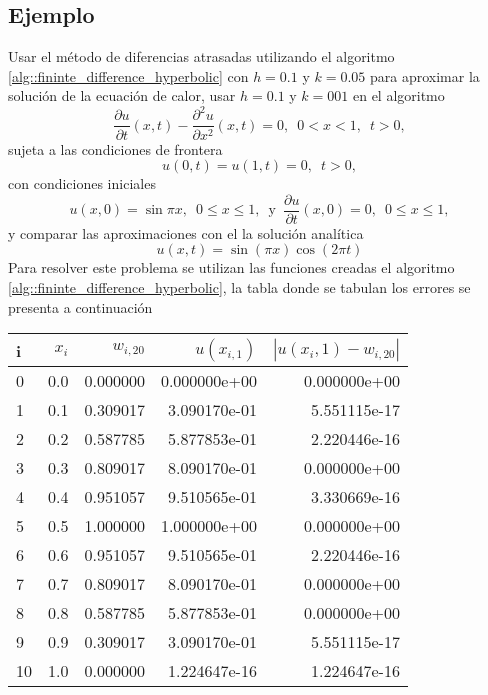 \documentclass[a4paper]{article}
\begin{document}
\subsection{Ejemplo}
Usar el método de diferencias atrasadas utilizando el algoritmo \ref{alg::fininte_difference_hyperbolic} con $h=0.1$ y $k=0.05$ para aproximar la solución de la ecuación de calor, usar $h=0.1$ y $k=001$ en el algoritmo
\begin{equation}
\frac{\partial u}{\partial t}(x,t) -\frac{\partial^2 u}{\partial x ^2}(x,t)=0, \,\,\, 0<x<1,\,\,\, t>0,
\end{equation}
sujeta a las condiciones de frontera
\begin{equation*}
u(0,t)=u(1,t)=0,\,\,\, t>0,
\end{equation*}
con condiciones iniciales
\begin{equation}
u(x,0)=\sin{\pi x},\,\,\, 0\leq x \leq 1,\,\,\,\text{y}\,\,\,\frac{\partial u}{\partial t}(x,0)=0,\,\,\, 0\leq x \leq 1,
\end{equation}
y comparar las aproximaciones con el la solución analítica
\begin{equation}
u(x,t)=\sin{(\pi x)}\cos{(2\pi t)}
\end{equation}
Para  resolver este problema se utilizan las funciones creadas el algoritmo \ref{alg::fininte_difference_hyperbolic}, la tabla donde se tabulan los errores se presenta a continuación\\
\begin{table}\label{Tab::table_1}
\begin{tabular}{lrrrr}%
\toprule
i &  $x_i$ &    $w_{i,20}$ &      $u(x_{i,1})$ &  $|u(x{_i,1})-w_{i,20}|$ \\
\midrule
0  &  0.0 &  0.000000 &  0.000000e+00 &       0.000000e+00 \\
1  &  0.1 &  0.309017 &  3.090170e-01 &       5.551115e-17 \\
2  &  0.2 &  0.587785 &  5.877853e-01 &       2.220446e-16 \\
3  &  0.3 &  0.809017 &  8.090170e-01 &       0.000000e+00 \\
4  &  0.4 &  0.951057 &  9.510565e-01 &       3.330669e-16 \\
5  &  0.5 &  1.000000 &  1.000000e+00 &       0.000000e+00 \\
6  &  0.6 &  0.951057 &  9.510565e-01 &       2.220446e-16 \\
7  &  0.7 &  0.809017 &  8.090170e-01 &       0.000000e+00 \\
8  &  0.8 &  0.587785 &  5.877853e-01 &       0.000000e+00 \\
9  &  0.9 &  0.309017 &  3.090170e-01 &       5.551115e-17 \\
10 &  1.0 &  0.000000 &  1.224647e-16 &       1.224647e-16 \\
\bottomrule
\end{tabular}
\end{table}
\end{document}
